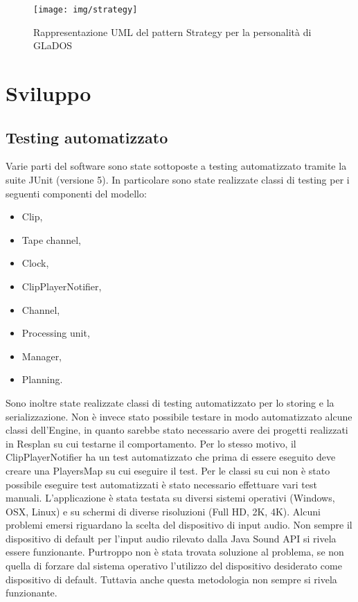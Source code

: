 \documentclass[a4paper,12pt]{report}
\begin{document}
\begin{figure}[H]
\centering{}
\texttt{[image: img/strategy]}
\caption{Rappresentazione UML del pattern Strategy per la personalità di GLaDOS}
\label{img:strategy}
\end{figure}

\chapter{Sviluppo}
\section{Testing automatizzato}
Varie parti del software sono state sottoposte a testing automatizzato tramite la suite JUnit (versione 5).
In particolare sono state realizzate classi di testing per i seguenti componenti del modello:
\begin{itemize}
    \item Clip,
    \item Tape channel,
    \item Clock,
    \item ClipPlayerNotifier,
    \item Channel,
    \item Processing unit,
    \item Manager,
    \item Planning.
\end{itemize}
Sono inoltre state realizzate classi di testing automatizzato per lo storing e la serializzazione.
Non è invece stato possibile testare in modo automatizzato alcune classi dell’Engine, in quanto sarebbe stato necessario avere dei progetti realizzati in Resplan su cui testarne il comportamento. 
Per lo stesso motivo, il ClipPlayerNotifier ha un test automatizzato che prima di essere eseguito deve creare una PlayersMap su cui eseguire il test.
Per le classi su cui non è stato possibile eseguire test automatizzati è stato necessario effettuare vari test manuali.
L’applicazione è stata testata su diversi sistemi operativi (Windows, OSX, Linux) e su schermi di diverse risoluzioni (Full HD, 2K, 4K).
Alcuni problemi emersi riguardano la scelta del dispositivo di input audio. Non sempre il dispositivo di default per l’input audio rilevato dalla Java Sound API si rivela essere funzionante. Purtroppo non è stata trovata soluzione al problema, se non quella di forzare dal sistema operativo l’utilizzo del dispositivo desiderato come dispositivo di default. Tuttavia anche questa metodologia non sempre si rivela funzionante.
\end{document}
